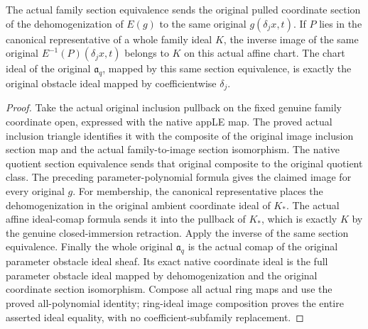 \begin{lemma}
\label{lem:c0n-original-native-chart-coefficients}
\leanok
{}
The actual family section equivalence sends the original pulled coordinate
section of the dehomogenization of $E(g)$ to the same original
$g(\delta_jx,t)$. If $P$ lies in the canonical representative of a whole family
ideal $K$, the inverse image of the same original
$E^{-1}(P)(\delta_jx,t)$ belongs to $K$ on this actual affine chart.
The chart ideal of the original $\mathfrak a_q$, mapped by this same section
equivalence, is exactly the original obstacle ideal mapped by coefficientwise
$\delta_j$.
\end{lemma}
\begin{proof}
Take the actual original inclusion pullback on the fixed genuine family
coordinate open, expressed with the native appLE map. The proved actual
inclusion triangle identifies it with the composite of the original image
inclusion section map and the actual family-to-image section isomorphism.
The native quotient section equivalence sends that original composite to the
original quotient class. The preceding parameter-polynomial formula gives
the claimed image for every original $g$. For membership, the canonical
representative places the dehomogenization in the original ambient coordinate
ideal of $K_*$. The actual affine ideal-comap formula sends it into the
pullback of $K_*$, which is exactly $K$ by the genuine closed-immersion
retraction. Apply the inverse of the same section equivalence. Finally the
whole original $\mathfrak a_q$ is the actual comap of the original parameter
obstacle ideal sheaf. Its exact native coordinate ideal is the full
parameter obstacle ideal mapped by dehomogenization and the original
coordinate section isomorphism. Compose all actual ring maps and use the
proved all-polynomial identity; ring-ideal image composition proves the
entire asserted ideal equality, with no coefficient-subfamily replacement.
\end{proof}
